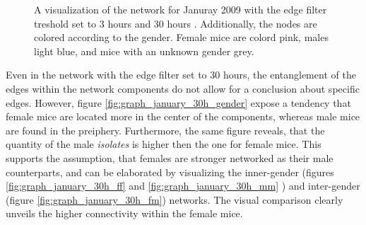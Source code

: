 \begin{figure}[htpb]%
	\centering 
	\qquad 
			
	\caption[Network visualizations with different edge filter values]{A visualization of the network for Januray 2009 with the edge filter treshold set to 3 hours  and 30 hours . Additionally, the nodes are colored according to the gender. Female mice are colord pink, males light blue, and mice with an unknown gender grey.} 
	 
\end{figure}

Even in the network with the edge filter set to 30 hours, the entanglement of the edges within the network components do not allow for a conclusion about specific edges. However, figure \ref{fig:graph_january_30h_gender} expose a tendency that female mice are located more in the center of the components, whereas male mice are found in the preiphery. Furthermore, the same figure reveals, that the quantity of the male \textit{isolates} is higher then the one for female mice. This supports the assumption, that females are stronger networked as their male counterparts, and can be elaborated by visualizing the inner-gender (figures \ref{fig:graph_january_30h_ff} and \ref{fig:graph_january_30h_mm} ) and inter-gender (figure \ref{fig:graph_january_30h_fm}) networks. The visual comparison clearly unveils the higher connectivity within the female mice.

